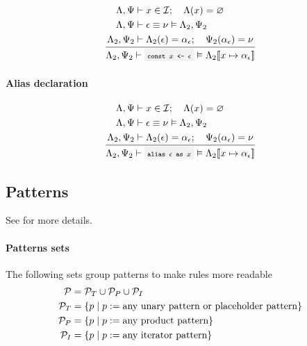 \[
	\oprule[aligned]{
		\EnvLoc,\EnvStore     &\then x \in \Id \semiq \EnvLoc(x) = \varnothing \\*
		\EnvLoc,\EnvStore     &\then \expr \eval \val \Then \EnvLoc_2,\EnvStore_2 \\*
		\EnvLoc_2,\EnvStore_2 &\then \EnvLoc_2(\expr) = \addr_\expr \semiq \EnvStore_2(\addr_\expr) = \val \\*
	}{
		\EnvLoc_2,\EnvStore_2\then \code{const $x$ <- $\expr$} \Then \EnvLoc_2\env{x \mapsto \addr_\expr}
	}
\]


\paragraph{Alias declaration}

\[
	\oprule[aligned]{
		\EnvLoc,\EnvStore     &\then x \in \Id \semiq \EnvLoc(x) = \varnothing \\*
		\EnvLoc,\EnvStore     &\then \expr \eval \val \Then \EnvLoc_2,\EnvStore_2 \\*
		\EnvLoc_2,\EnvStore_2 &\then \EnvLoc_2(\expr) = \addr_\expr \semiq \EnvStore_2(\addr_\expr) = \val \\*
	}{
		\EnvLoc_2,\EnvStore_2\then \code{alias $\expr$ as $x$} \Then \EnvLoc_2\env{x \mapsto \addr_\expr}
	}
\]

\clearpage

\subsection{Patterns}

See  for more details.

\paragraph{Patterns sets} The following sets group patterns to make rules more
readable
\[
	\begin{split}
		\mathcal{P}         &= \mathcal{P}_T \cup \mathcal{P}_P \cup \mathcal{P}_I\\*
		\mathcal{P}_T &= \left\{p \mid p := \text{any unary pattern or placeholder pattern}\right\}\\*
		\mathcal{P}_P  &= \left\{p \mid p := \text{any product pattern}\right\}\\*
		\mathcal{P}_I &= \left\{p \mid p := \text{any iterator pattern}\right\}\\*
	\end{split}
\]

